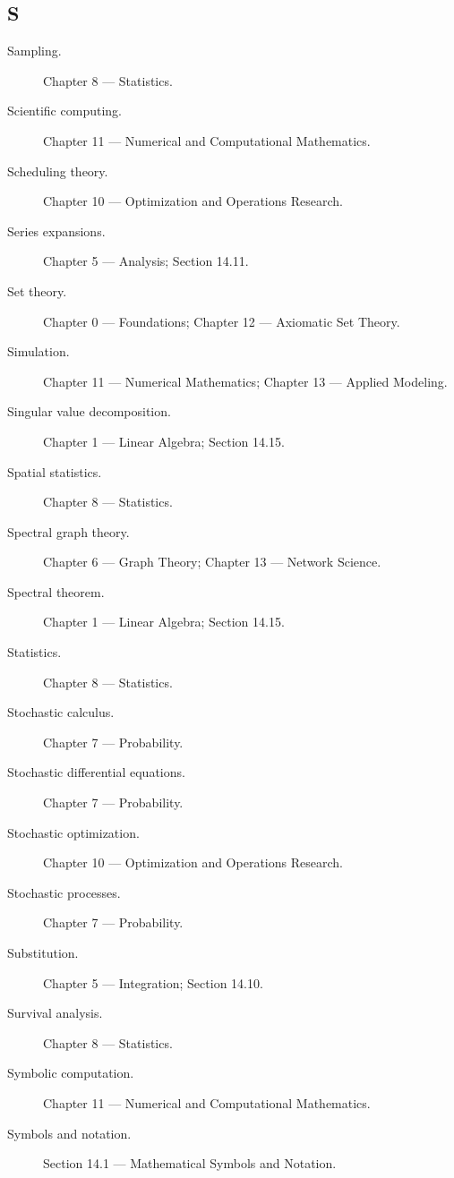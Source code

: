 \subsection*{S}

\begin{description}

\item[Sampling.]
Chapter 8 --- Statistics.

\item[Scientific computing.]
Chapter 11 --- Numerical and Computational Mathematics.

\item[Scheduling theory.]
Chapter 10 --- Optimization and Operations Research.

\item[Series expansions.]
Chapter 5 --- Analysis;
Section 14.11.

\item[Set theory.]
Chapter 0 --- Foundations;
Chapter 12 --- Axiomatic Set Theory.

\item[Simulation.]
Chapter 11 --- Numerical Mathematics;
Chapter 13 --- Applied Modeling.

\item[Singular value decomposition.]
Chapter 1 --- Linear Algebra;
Section 14.15.

\item[Spatial statistics.]
Chapter 8 --- Statistics.

\item[Spectral graph theory.]
Chapter 6 --- Graph Theory;
Chapter 13 --- Network Science.

\item[Spectral theorem.]
Chapter 1 --- Linear Algebra;
Section 14.15.

\item[Statistics.]
Chapter 8 --- Statistics.

\item[Stochastic calculus.]
Chapter 7 --- Probability.

\item[Stochastic differential equations.]
Chapter 7 --- Probability.

\item[Stochastic optimization.]
Chapter 10 --- Optimization and Operations Research.

\item[Stochastic processes.]
Chapter 7 --- Probability.

\item[Substitution.]
Chapter 5 --- Integration;
Section 14.10.

\item[Survival analysis.]
Chapter 8 --- Statistics.

\item[Symbolic computation.]
Chapter 11 --- Numerical and Computational Mathematics.

\item[Symbols and notation.]
Section 14.1 --- Mathematical Symbols and Notation.

\end{description}

